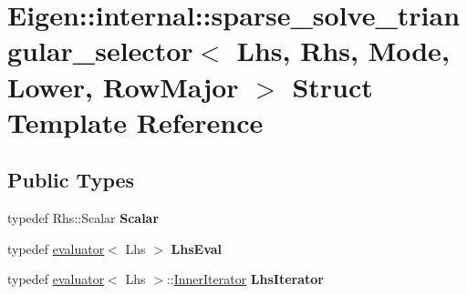 \hypertarget{struct_eigen_1_1internal_1_1sparse__solve__triangular__selector_3_01_lhs_00_01_rhs_00_01_mode_00_01_lower_00_01_row_major_01_4}{}\section{Eigen\+::internal\+::sparse\+\_\+solve\+\_\+triangular\+\_\+selector$<$ Lhs, Rhs, Mode, Lower, Row\+Major $>$ Struct Template Reference}
\label{struct_eigen_1_1internal_1_1sparse__solve__triangular__selector_3_01_lhs_00_01_rhs_00_01_mode_00_01_lower_00_01_row_major_01_4}
\subsection*{Public Types}
\begin{DoxyCompactItemize}
\item 
\mbox{\label{struct_eigen_1_1internal_1_1sparse__solve__triangular__selector_3_01_lhs_00_01_rhs_00_01_mode_00_01_lower_00_01_row_major_01_4_a0c354a1ca81e2dd528d0367a1c4fc4a2}} 
typedef Rhs\+::\+Scalar {\bfseries Scalar}
\item 
\mbox{\label{struct_eigen_1_1internal_1_1sparse__solve__triangular__selector_3_01_lhs_00_01_rhs_00_01_mode_00_01_lower_00_01_row_major_01_4_a58331b737f5a5b2e0facb4f30d0b0433}} 
typedef \mbox{\hyperlink{struct_eigen_1_1internal_1_1evaluator}{evaluator}}$<$ Lhs $>$ {\bfseries Lhs\+Eval}
\item 
\mbox{\label{struct_eigen_1_1internal_1_1sparse__solve__triangular__selector_3_01_lhs_00_01_rhs_00_01_mode_00_01_lower_00_01_row_major_01_4_ac06cb9e6d635f18def4cc49d5a298774}} 
typedef \mbox{\hyperlink{struct_eigen_1_1internal_1_1evaluator}{evaluator}}$<$ Lhs $>$\+::\mbox{\hyperlink{class_eigen_1_1_inner_iterator}{Inner\+Iterator}} {\bfseries Lhs\+Iterator}
\end{DoxyCompactItemize}
